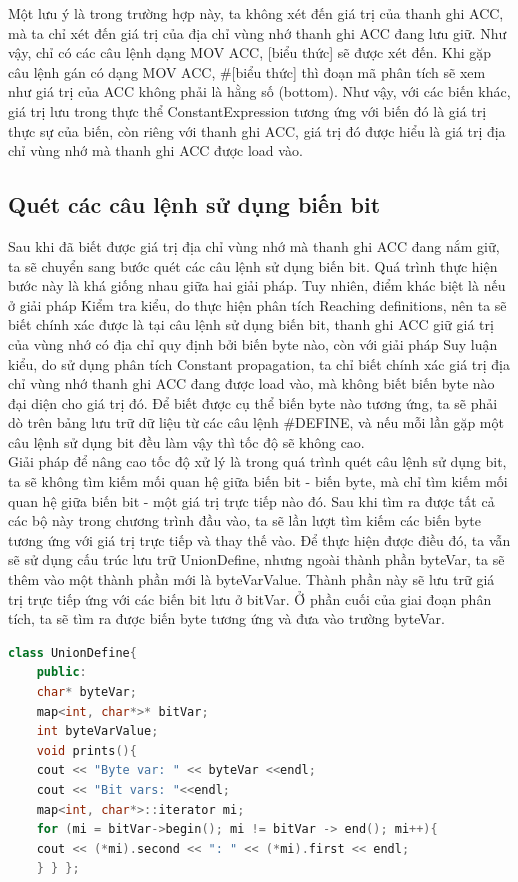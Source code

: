 Một lưu ý là trong trường hợp này, ta không xét đến giá trị của thanh ghi ACC, mà ta chỉ xét đến giá trị của địa chỉ vùng nhớ thanh ghi ACC đang lưu giữ. Như vậy, chỉ có các câu lệnh dạng MOV ACC, [biểu thức] sẽ được xét đến. Khi gặp câu lệnh gán có dạng MOV ACC, \#[biểu thức] thì đoạn mã phân tích sẽ xem như giá trị của ACC không phải là hằng số (bottom). Như vậy, với các biến khác, giá trị lưu trong thực thể ConstantExpression tương ứng với biến đó là giá trị thực sự của biến, còn riêng với thanh ghi ACC, giá trị đó được hiểu là giá trị địa chỉ vùng nhớ mà thanh ghi ACC được load vào.
\subsection{Quét các câu lệnh sử dụng biến bit}

Sau khi đã biết được giá trị địa chỉ vùng nhớ mà thanh ghi ACC đang nắm giữ, ta sẽ chuyển sang bước quét các câu lệnh sử dụng biến bit. Quá trình thực hiện bước này là khá giống nhau giữa hai giải pháp. Tuy nhiên, điểm khác biệt là nếu ở giải pháp Kiểm tra kiểu, do thực hiện phân tích Reaching definitions, nên ta sẽ biết chính xác được là tại câu lệnh sử dụng biến bit, thanh ghi ACC giữ giá trị của vùng nhớ có địa chỉ quy định bởi biến byte nào, còn với giải pháp Suy luận kiểu, do sử dụng phân tích Constant propagation, ta chỉ biết chính xác giá trị địa chỉ vùng nhớ thanh ghi ACC đang được load vào, mà không biết biến byte nào đại diện cho giá trị đó. Để biết được cụ thể biến byte nào tương ứng, ta sẽ phải dò trên bảng lưu trữ dữ liệu từ các câu lệnh \#DEFINE, và nếu mỗi lần gặp một câu lệnh sử dụng bit đều làm vậy thì tốc độ sẽ không cao.\\

Giải pháp để nâng cao tốc độ xử lý là trong quá trình quét câu lệnh sử dụng bit, ta sẽ không tìm kiếm mối quan hệ giữa biến bit - biến byte, mà chỉ tìm kiếm mối quan hệ giữa biến bit - một giá trị trực tiếp nào đó. Sau khi tìm ra được tất cả các bộ này trong chương trình đầu vào, ta sẽ lần lượt tìm kiếm các biến byte tương ứng với giá trị trực tiếp và thay thế vào. Để thực hiện được điều đó, ta vẫn sẽ sử dụng cấu trúc lưu trữ UnionDefine, nhưng ngoài thành phần byteVar, ta sẽ thêm vào một thành phần mới là byteVarValue. Thành phần này sẽ lưu trữ giá trị trực tiếp ứng với các biến bit lưu ở bitVar. Ở phần cuối của giai đoạn phân tích, ta sẽ tìm ra được biến byte tương ứng và đưa vào trường byteVar.\\

\begin{lstlisting}[caption={Đoạn mã mới của class UnionDefine},label={list:listnewuniondefine},language=c++]
	class UnionDefine{
	public:
	char* byteVar;
	map<int, char*>* bitVar;
	int byteVarValue;
	void prints(){
	cout << "Byte var: " << byteVar <<endl;
	cout << "Bit vars: "<<endl;
	map<int, char*>::iterator mi;
	for (mi = bitVar->begin(); mi != bitVar -> end(); mi++){
	cout << (*mi).second << ": " << (*mi).first << endl;
	} } };
\end{lstlisting}

